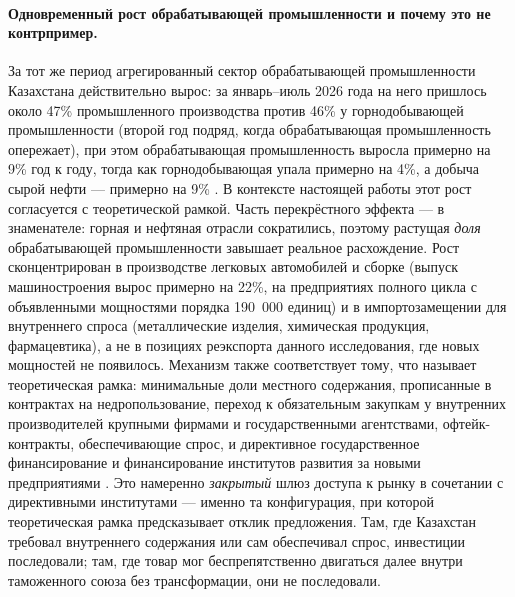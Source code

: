 \documentclass[12pt]{article}
\begin{document}
\paragraph{Одновременный рост обрабатывающей промышленности и почему это не контрпример.}
За тот же период агрегированный сектор обрабатывающей промышленности Казахстана
действительно вырос: за январь--июль 2026 года на него пришлось около 47\% промышленного
производства против 46\% у горнодобывающей промышленности (второй год подряд, когда
обрабатывающая промышленность опережает), при этом обрабатывающая промышленность выросла
примерно на 9\% год к году, тогда как горнодобывающая упала примерно на 4\%, а добыча сырой
нефти — примерно на 9\% \citep{qazstat2026industry}. В контексте настоящей работы этот рост
согласуется с теоретической рамкой. Часть перекрёстного эффекта — в знаменателе: горная и
нефтяная отрасли сократились, поэтому растущая \emph{доля} обрабатывающей промышленности
завышает реальное расхождение. Рост сконцентрирован в производстве легковых автомобилей и
сборке (выпуск машиностроения вырос примерно на 22\%, на предприятиях полного цикла с
объявленными мощностями порядка 190~000 единиц) и в импортозамещении для внутреннего
спроса (металлические изделия, химическая продукция, фармацевтика), а не в позициях
реэкспорта данного исследования, где новых мощностей не появилось. Механизм также
соответствует тому, что называет теоретическая рамка: минимальные доли местного содержания,
прописанные в контрактах на недропользование, переход к обязательным закупкам у внутренних
производителей крупными фирмами и государственными агентствами, офтейк-контракты,
обеспечивающие спрос, и директивное государственное финансирование и финансирование
институтов развития за новыми предприятиями \citep{kzgov2026domprod,eaeu2014treaty}. Это
намеренно \emph{закрытый} шлюз доступа к рынку в сочетании с директивными институтами —
именно та конфигурация, при которой теоретическая рамка предсказывает отклик предложения.
Там, где Казахстан требовал внутреннего содержания или сам обеспечивал спрос, инвестиции
последовали; там, где товар мог беспрепятственно двигаться далее внутри таможенного союза
без трансформации, они не последовали.
\end{document}
